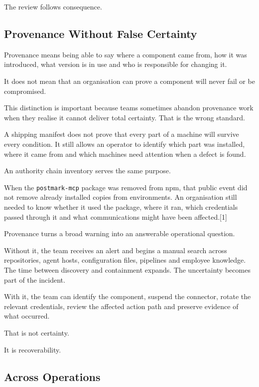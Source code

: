 The review follows consequence.

\subsection{Provenance Without False
Certainty}\label{provenance-without-false-certainty}

Provenance means being able to say where a component came from, how it
was introduced, what version is in use and who is responsible for
changing it.

It does not mean that an organisation can prove a component will never
fail or be compromised.

This distinction is important because teams sometimes abandon provenance
work when they realise it cannot deliver total certainty. That is the
wrong standard.

A shipping manifest does not prove that every part of a machine will
survive every condition. It still allows an operator to identify which
part was installed, where it came from and which machines need attention
when a defect is found.

An authority chain inventory serves the same purpose.

When the \texttt{postmark-mcp} package was removed from npm, that public
event did not remove already installed copies from environments. An
organisation still needed to know whether it used the package, where it
ran, which credentials passed through it and what communications might
have been affected.{[}1{]}

Provenance turns a broad warning into an answerable operational
question.

Without it, the team receives an alert and begins a manual search across
repositories, agent hosts, configuration files, pipelines and employee
knowledge. The time between discovery and containment expands. The
uncertainty becomes part of the incident.

With it, the team can identify the component, suspend the connector,
rotate the relevant credentials, review the affected action path and
preserve evidence of what occurred.

That is not certainty.

It is recoverability.

\subsection{Across Operations}\label{across-operations}

